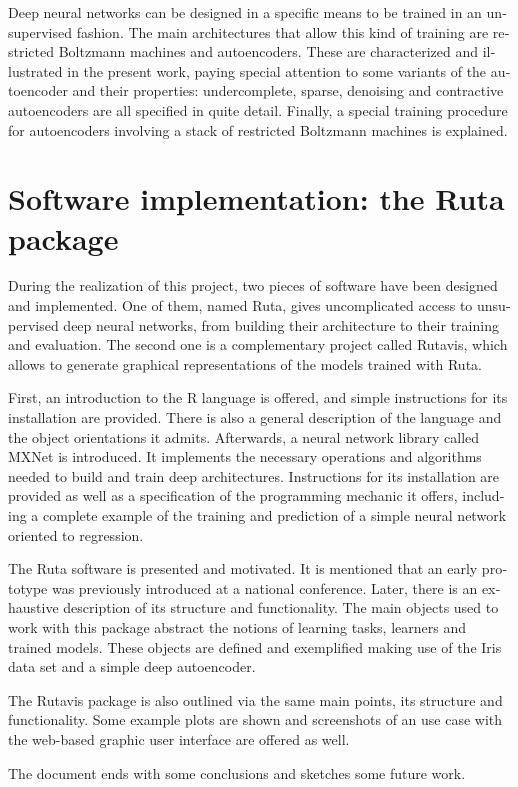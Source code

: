 \begin{otherlanguage}{american}
Deep neural networks can be designed in a specific means to be trained in an unsupervised fashion. The main architectures that allow this kind of training are restricted Boltzmann machines and autoencoders. These are characterized and illustrated in the present work, paying special attention to some variants of the autoencoder and their properties: undercomplete, sparse, denoising and contractive autoencoders are all specified in quite detail. Finally, a special training procedure for autoencoders involving a stack of restricted Boltzmann machines is explained.

\section*{Software implementation: the Ruta package}

During the realization of this project, two pieces of software have been designed and implemented. One of them, named Ruta, gives uncomplicated access to unsupervised deep neural networks, from building their architecture to their training and evaluation. The second one is a complementary project called Rutavis, which allows to generate graphical representations of the models trained with Ruta.

First, an introduction to the R language is offered, and simple instructions for its installation are provided. There is also a general description of the language and the object orientations it admits. Afterwards, a neural network library called MXNet is introduced. It implements the necessary operations and algorithms needed to build and train deep architectures. Instructions for its installation are provided as well as a specification of the programming mechanic it offers, including a complete example of the training and prediction of a simple neural network oriented to regression.

The Ruta software is presented and motivated. It is mentioned that an early prototype was previously introduced at a national conference. Later, there is an exhaustive description of its structure and functionality. The main objects used to work with this package abstract the notions of learning tasks, learners and trained models. These objects are defined and exemplified making use of the Iris data set and a simple deep autoencoder.

The Rutavis package is also outlined via the same main points, its structure and functionality. Some example plots are shown and screenshots of an use case with the web-based graphic user interface are offered as well.

The document ends with some conclusions and sketches some future work.

\end{otherlanguage}